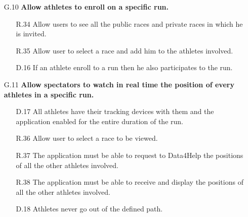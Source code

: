 \begin{enumerate}
\begin{enumerate}
	\item [G.10] \textbf{Allow athletes to enroll on a specific run.}
		\begin{enumerate}
		\item [R.34] Allow users to see all the public races and private races in which he is invited.
		\item [R.35] Allow user to select a race and add him to the athletes involved.
		\item [D.16] If an athlete enroll to a run then he also participates to the run.
		\end{enumerate}
	
	\item [G.11] \textbf{Allow spectators to watch in real time the position of every athletes in a specific run.}
		\begin{enumerate}
		\item [D.17] All athletes have their tracking devices with them and the application enabled for the entire duration of the run.	
		\item [R.36] Allow user to select a race to be viewed.
		\item [R.37] The application must be able to request to Data4Help the positions of all the other athletes involved.
		\item [R.38] The application must be able to receive and display the positions of all the other athletes involved.
		\item [D.18] Athletes never go out of the defined path.
		\end{enumerate}
	\end{enumerate}

\end{enumerate}

